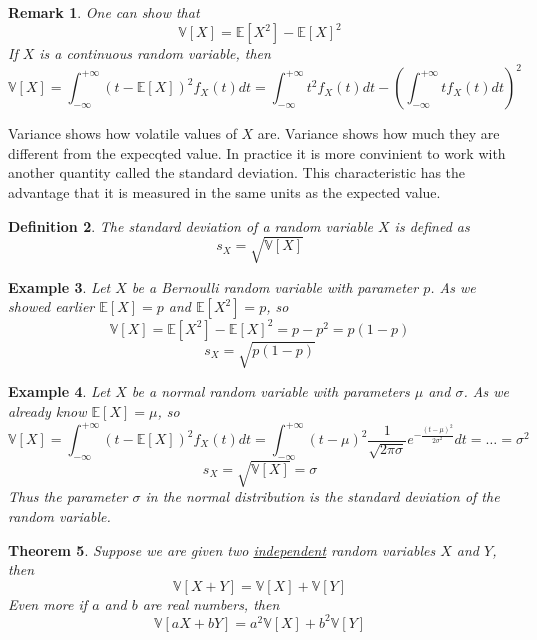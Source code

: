 \documentclass[12pt]{article}
\newtheorem{theorem}{Theorem}[subsection]
\newtheorem{remark}[theorem]{Remark}
\newtheorem{definition}[theorem]{Definition}
\newtheorem{example}[theorem]{Example}
\begin{document}
\begin{remark} One can show that
    $$
        \mathbb{V}[X]=\mathbb{E}[X^2]-{\mathbb{E}[X]}^2
    $$
    If $X$ is a continuous random variable, then
    $$
        \mathbb{V}[X]
        =\int_{-\infty}^{+\infty} {(t-\mathbb{E}[X])}^2 f_X(t)dt
        =\int_{-\infty}^{+\infty} t^2 f_X(t)dt-
        {\left( \int_{-\infty}^{+\infty} t f_X(t)dt\right)}^2
    $$
\end{remark}

Variance shows how volatile values of $X$ are. Variance shows how much they are
different from the expecqted value. In practice it is more convinient to work
with another quantity called the standard deviation. This characteristic has the
advantage that it is measured in the same units as the expected value.

\begin{definition} The standard deviation of a random variable $X$ is defined as
    $$
        s_X=\sqrt{\mathbb{V}[X]}
    $$
\end{definition}

\begin{example} Let $X$ be a Bernoulli random variable with parameter $p$. As we
    showed earlier $\mathbb{E}[X]=p$ and $\mathbb{E}[X^2]=p$, so
    $$
        \mathbb{V}[X]=\mathbb{E}[X^2]-{\mathbb{E}[X]}^2=p-p^2=p(1-p)
    $$
    $$
        s_X=\sqrt{p(1-p)}
    $$
\end{example}

\begin{example} Let $X$ be a normal random variable with parameters $\mu$ and
    $\sigma$. As we already know $\mathbb{E}[X]=\mu$, so
    $$
        \mathbb{V}[X]
        =\int_{-\infty}^{+\infty}{(t-\mathbb{E}[X])}^2 f_X(t)dt
        =\int_{-\infty}^{+\infty}{(t-\mu)}^2
        \frac{1}{\sqrt{2\pi\sigma}}e^{-\frac{{(t-\mu)}^2}{2\sigma^2}}dt
        =\ldots
        =\sigma^2
    $$
    $$
        s_X=\sqrt{\mathbb{V}[X]}=\sigma
    $$
    Thus the parameter $\sigma$ in the normal distribution is the standard 
    deviation of the random variable.
\end{example}

\begin{theorem} Suppose we are given two \underline{independent} random
    variables $X$ and $Y$, then
    $$
        \mathbb{V}[X+Y]=\mathbb{V}[X]+\mathbb{V}[Y]
    $$
    Even more if $a$ and $b$ are real numbers, then
    $$
        \mathbb{V}[aX+bY]=a^2\mathbb{V}[X]+b^2\mathbb{V}[Y]
    $$
\end{theorem}
\end{document}
